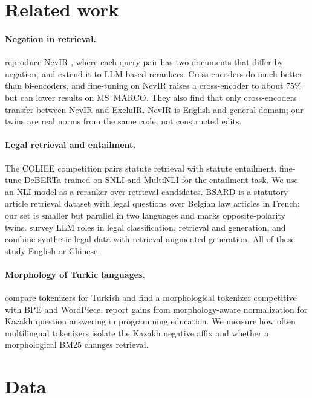 \documentclass[11pt]{article}
\begin{document}
\section{Related work}

\paragraph{Negation in retrieval.} \citet{vandenelsen2025nevir} reproduce NevIR \citep{weller-etal-2024-nevir}, where each query pair has
two documents that differ by negation, and extend it to LLM-based rerankers. Cross-encoders do much better
than bi-encoders, and fine-tuning on NevIR raises a cross-encoder to about 75\% but can lower results on
MS~MARCO. They also find that only cross-encoders transfer between NevIR and ExcluIR. NevIR is English and
general-domain; our twins are real norms from the same code, not constructed edits.

\paragraph{Legal retrieval and entailment.} The COLIEE competition pairs statute retrieval with statute
entailment. \citet{kim2024coliee} fine-tune DeBERTa trained on SNLI and MultiNLI for the entailment task.
We use an NLI model as a reranker over retrieval candidates. BSARD \citep{louis-spanakis-2022-statutory} is a
statutory article retrieval dataset with legal questions over Belgian law articles in French; our set is
smaller but parallel in two languages and marks opposite-polarity twins. \citet{chi2026legalai} survey LLM roles in legal
classification, retrieval and generation, and \citet{ren2026legal} combine synthetic legal data with
retrieval-augmented generation. All of these study English or Chinese.

\paragraph{Morphology of Turkic languages.} \citet{toraman2023tokenization} compare tokenizers for Turkish
and find a morphological tokenizer competitive with BPE and WordPiece. \citet{tukeyev2026kazakh} report gains
from morphology-aware normalization for Kazakh question answering in programming education. We measure how
often multilingual tokenizers isolate the Kazakh negative affix and whether a morphological BM25 changes
retrieval.

\section{Data}
\end{document}

